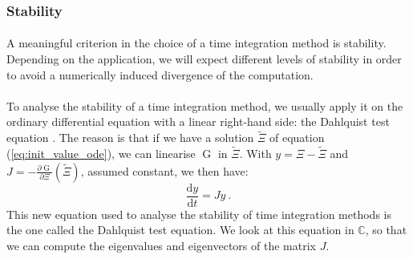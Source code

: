       \subsubsection{Stability}

        \paragraph{}
        A meaningful criterion in the choice of a time integration method is stability.
        Depending on the application, we will expect different levels of stability in order to avoid a numerically induced divergence of the computation.

        \paragraph{}
        To analyse the stability of a time integration method, we usually apply it on the ordinary differential equation with a linear right-hand side: the Dahlquist test equation \cite{HairerWanner1996}.
        The reason is that if we have a solution $\tilde{\Xi}$ of equation (\ref{eq:init_value_ode}), we can linearise $\operatorname{G}$ in $\tilde{\Xi}$.
        With $y = \Xi - \tilde{\Xi}$ and $J = -\frac{\partial \operatorname{G}}{\partial \Xi}\left(\tilde{\Xi}\right)$, assumed constant, we then have:
        \begin{equation}\label{eq:dahlquist}
          \frac{\mathrm{d} y}{\mathrm{d} t} = J y \ .
        \end{equation}
        This new equation used to analyse the stability of time integration methods is the one called the Dahlquist test equation.
        We look at this equation in $\mathbb{C}$, so that we can compute the eigenvalues and eigenvectors of the matrix $J$.

